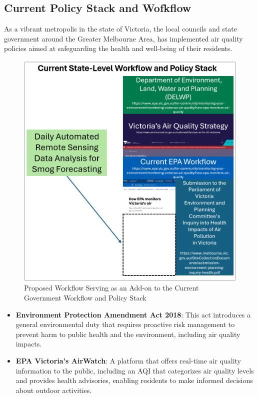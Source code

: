 \documentclass[
  letterpaper,
  DIV=11,
  numbers=noendperiod]{scrreprt}
\begin{document}
\hypertarget{current-policy-stack-and-wofkflow}{%
\subsection*{Current Policy Stack and
Wofkflow}\label{current-policy-stack-and-wofkflow}}

As a vibrant metropolis in the state of Victoria, the local councils and
state government around the Greater Melbourne Area, has implemented air
quality policies aimed at safeguarding the health and well-being of
their residents.

\begin{figure}

{\centering \includegraphics[width=5.01042in,height=\textheight]{images/wk4/wk4_logic_flow.png}

}

\caption{Proposed Workflow Serving as an Add-on to the Current
Government Workflow and Policy Stack}

\end{figure}

\begin{itemize}
\item
  \textbf{Environment Protection Amendment Act 2018}: This act
  introduces a general environmental duty that requires proactive risk
  management to prevent harm to public health and the environment,
  including air quality impacts.
\item
  \textbf{EPA Victoria's AirWatch}: A platform that offers real-time air
  quality information to the public, including an AQI that categorizes
  air quality levels and provides health advisories, enabling residents
  to make informed decisions about outdoor activities.
\end{itemize}
\end{document}
